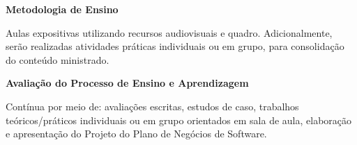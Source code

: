 







\begin{snugshade}\begin{center}\textbf{
    Metodologia de Ensino
}\end{center}\end{snugshade}

\noindent
Aulas expositivas utilizando recursos audiovisuais e quadro. Adicionalmente, serão realizadas atividades práticas individuais ou em grupo, para consolidação do conteúdo ministrado.

\begin{snugshade}\begin{center}\textbf{
    Avaliação do Processo de Ensino e Aprendizagem
}\end{center}\end{snugshade}

\noindent
Contínua por meio de: avaliações escritas, estudos de caso, trabalhos teóricos/práticos individuais ou em grupo orientados em sala de aula, elaboração e apresentação do Projeto do Plano de Negócios de Software. 

